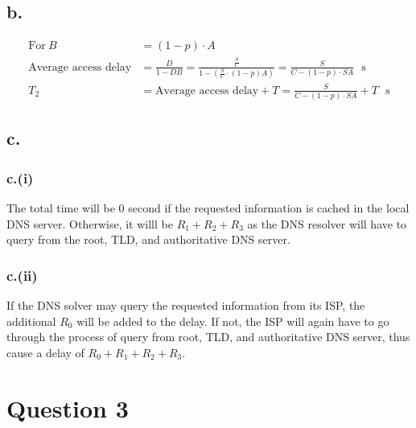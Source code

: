 \documentclass[12pt]{article}
\begin{document}
\subsection{b.}

\begin{align*}
    \text{For} \ B &= (1-p) \cdot A \\
    \text{Average access delay} &= \frac{D}{1-DB} = \frac{\frac{S}{C}}{1-(\frac{S}{C} \cdot (1-p) A)} = \frac{S}{C-(1-p) \cdot SA}\ \ \ \text{s} \\
    T_2 &= \text{Average access delay} + T = \frac{S}{C-(1-p) \cdot SA} + T \ \ \ \text{s}
\end{align*}

\subsection{c.}
\subsubsection{c.(i)}
The total time will be $0$ second if the requested information is cached in the local DNS server. Otherwise, it willl be $R_1 + R_2 + R_3$ as the DNS resolver will have to query from the root, TLD, and authoritative DNS server.


\subsubsection{c.(ii)}
If the DNS solver may query the requested information from its ISP, the additional $R_0$ will be added to the delay. If not, the ISP will again have to go through the process of query from root, TLD, and authoritative DNS server, thus cause a delay of $R_0 + R_1 + R_2 + R_3$.

\section{Question 3}

%
% 
% 
\end{document}
